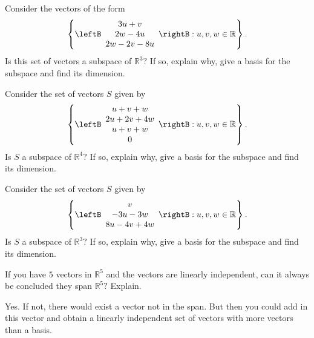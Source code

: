 \begin{enumialphparenastyle}
\begin{ex} Consider the vectors of the form 
\begin{equation*}
\left\{ \leftB 
\begin{array}{c}
3u+v \\ 
2w-4u \\ 
2w-2v-8u
\end{array}
\rightB :u,v,w\in \mathbb{R}\right\} .
\end{equation*}
Is this set of vectors a subspace of $\mathbb{R}^{3}?$ If so, explain why,
give a basis for the subspace and find its dimension.
\end{ex}

\begin{ex} Consider the set of vectors $S$ given by  
\begin{equation*}
\left\{ \leftB 
\begin{array}{c}
u+v+w \\ 
2u+2v+4w \\ 
u+v+w \\ 
0
\end{array}
\rightB :u,v,w\in \mathbb{R}\right\} .
\end{equation*}
Is $S$ a subspace of $\mathbb{R}^{4}?$ If so, explain why,
give a basis for the subspace and find its dimension.
\end{ex}

\begin{ex} Consider the set of vectors $S$ given by  
\begin{equation*}
\left\{ \leftB 
\begin{array}{c}
v \\ 
-3u-3w \\ 
8u-4v+4w
\end{array}
\rightB :u,v,w\in \mathbb{R}\right\} .
\end{equation*}
Is $S$ a subspace of $\mathbb{R}^{3}?$ If so, explain why,
give a basis for the subspace and find its dimension.
\end{ex}

\begin{ex} If you have $5$ vectors in $\mathbb{R}^{5}$ and the vectors are
linearly independent, can it always be concluded they span $\mathbb{R}^{5}?$
Explain. 
\begin{sol}
 Yes. If not, there would exist a vector not in the span. But then
you could add in this vector and obtain a linearly independent set of
vectors with more vectors than a basis.
\end{sol}
\end{ex}


\end{enumialphparenastyle}
